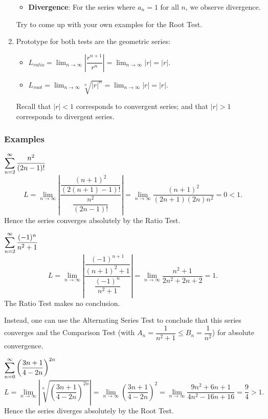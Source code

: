 \begin{rmk}
\begin{enumerate}
\begin{itemize}
            \item \textbf{Divergence}: For the series where $a_n = 1$ for all $n$, we observe divergence.
    
        \end{itemize}
        Try to come up with your own examples for the Root Test.
        

        \item Prototype for both tests are the geometric series:
        \begin{itemize}
            \item $L_{ratio} = \lim_{n\to \infty} \left| \dfrac{r^{n+1}}{r^n}\right| = \lim_{n\to \infty} |r| = |r|$.
            \item  $L_{root} = \lim_{n\to \infty} \sqrt[n]{|r|^n} = \lim_{n\to \infty} |r| = |r|$.
        \end{itemize}
        Recall that $|r| < 1$ corresponds to convergent series; and  that $|r| > 1$ corresponds to divergent series.
    \end{enumerate}
\end{rmk}


\subsubsection{Examples}
\begin{ex}
    $\displaystyle\sum_{n=2}^\infty \dfrac{n^2}{(2n-1)!}$ 
    \[ L = \lim_{n\to \infty} \left| \dfrac{\dfrac{(n+1)^2}{(2(n+1)-1)!}}{\dfrac{n^2}{(2n-1)!}}\right| = \lim_{n\to \infty} \dfrac{(n+1)^2}{(2n+1)(2n) n^2} = 0 < 1.\]
    Hence the series converges absolutely by the Ratio Test. 
\end{ex}

\begin{ex}
    $\displaystyle\sum_{n=2}^\infty \dfrac{(-1)^n}{n^2+1}$ 
    \[ L = \lim_{n\to \infty} \left| \dfrac{\dfrac{(-1)^{n+1}}{(n+1)^2+1}}{\dfrac{(-1)^n}{n^2+1}}\right| = \lim_{n\to \infty} \dfrac{n^2+1}{2n^2+2n+2} = 1.\]
    The Ratio Test makes no conclusion. 
\end{ex}

Instead, one can use the Alternating Series Test to conclude that this series converges and the Comparison Test (with $A_n = \dfrac{1}{n^2+1} \leq B_n = \dfrac{1}{n^2}$) for absolute convergence.

\begin{ex}
    $\displaystyle\sum_{n=0}^\infty \left( \dfrac{3n+1}{4-2n} \right)^{2n}$ 
    \[ L = \lim_{n\to \infty} \left|\sqrt[n]{\left( \dfrac{3n+1}{4-2n} \right)^{2n}}\right| = \lim_{n\to \infty} \left( \dfrac{3n+1}{4-2n} \right)^{2} = \lim_{n\to \infty} \dfrac{9n^2+6n+1}{4n^2-16n+16} = \dfrac{9}{4} > 1.\]
    Hence the series diverges absolutely by the Root Test. 
\end{ex}


